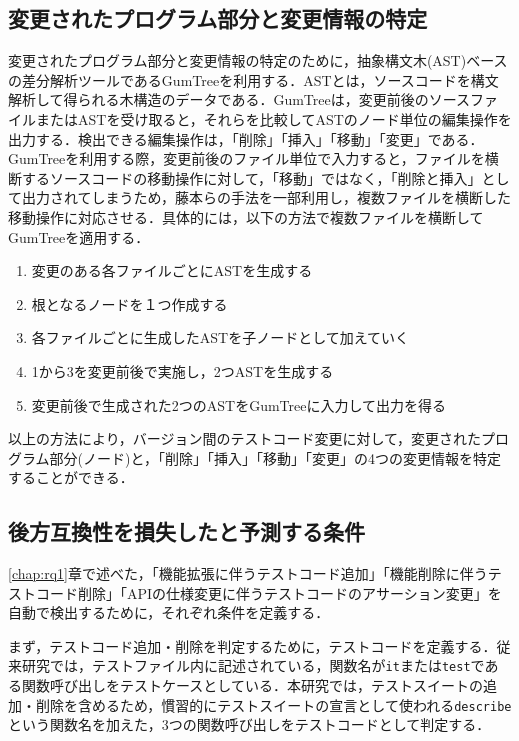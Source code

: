 \documentclass[11pt,dvipdfmx]{jreport}
\begin{document}
\subsection{変更されたプログラム部分と変更情報の特定}\label{astseisei}
変更されたプログラム部分と変更情報の特定のために，抽象構文木(AST)ベースの差分解析ツールであるGumTree\cite{gumtree}を利用する．ASTとは，ソースコードを構文解析して得られる木構造のデータである．GumTreeは，変更前後のソースファイルまたはASTを受け取ると，それらを比較してASTのノード単位の編集操作を出力する．検出できる編集操作は，「削除」「挿入」「移動」「変更」である．GumTreeを利用する際，変更前後のファイル単位で入力すると，ファイルを横断するソースコードの移動操作に対して，「移動」ではなく，「削除と挿入」として出力されてしまうため，藤本らの手法\cite{gumtreenoyatu}を一部利用し，複数ファイルを横断した移動操作に対応させる．具体的には，以下の方法で複数ファイルを横断してGumTreeを適用する．

\begin{enumerate}
  \setlength{\itemsep}{0cm}
  \item 変更のある各ファイルごとにASTを生成する
  \item 根となるノードを１つ作成する
  \item 各ファイルごとに生成したASTを子ノードとして加えていく
  \item 1から3を変更前後で実施し，2つASTを生成する
  \item 変更前後で生成された2つのASTをGumTreeに入力して出力を得る
\end{enumerate}

以上の方法により，バージョン間のテストコード変更に対して，変更されたプログラム部分(ノード)と，「削除」「挿入」「移動」「変更」の4つの変更情報を特定することができる．

\subsection{後方互換性を損失したと予測する条件}\label{rq2nojouken}
\ref{chap:rq1}章で述べた，「機能拡張に伴うテストコード追加」「機能削除に伴うテストコード削除」「APIの仕様変更に伴うテストコードのアサーション変更」を自動で検出するために，それぞれ条件を定義する．

まず，テストコード追加・削除を判定するために，テストコードを定義する．従来研究\cite{matsuda}では，テストファイル内に記述されている，関数名が{\verb|it|}または{\verb|test|}である関数呼び出しをテストケースとしている．本研究では，テストスイートの追加・削除を含めるため，慣習的にテストスイートの宣言として使われる{\verb|describe|}という関数名を加えた，3つの関数呼び出しをテストコードとして判定する．
\end{document}
